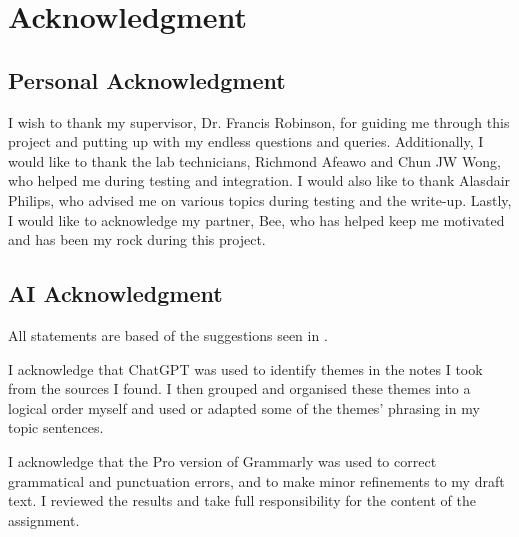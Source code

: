 {\let\clearpage\relax\chapter{Acknowledgment}}
\section{Personal Acknowledgment}
I wish to thank my supervisor, Dr. Francis Robinson, for guiding me through this project and putting up with my endless questions and queries. Additionally, I would like to thank the lab technicians, Richmond Afeawo and Chun JW Wong, who helped me during testing and integration. I would also like to thank Alasdair Philips, who advised me on various topics during testing and the write-up. Lastly, I would like to acknowledge my partner, Bee, who has helped keep me motivated and has been my rock during this project.

\section{AI Acknowledgment}
All statements are based of the suggestions seen in \cite{Rowland_2023}.

I acknowledge that ChatGPT was used to identify themes in the notes I took from the sources I found. I then grouped and organised these themes into a logical order myself and used or adapted some of the themes' phrasing in my topic sentences.

I acknowledge that the Pro version of Grammarly was used to correct grammatical and punctuation errors, and to make minor refinements to my draft text. I reviewed the results and take full responsibility for the content of the assignment.



